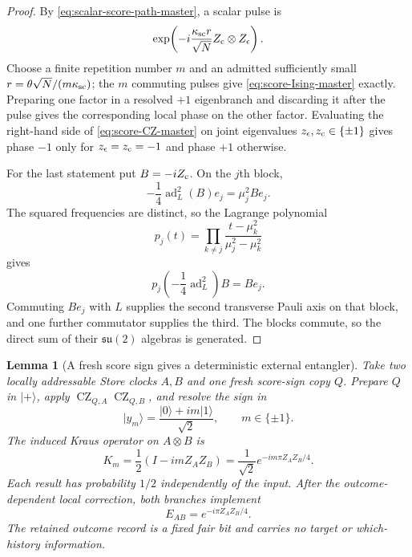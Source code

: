 \documentclass[11pt]{article}
\newtheorem{lemma}[theorem]{Lemma}
\theoremstyle{definition}
\theoremstyle{remark}
\begin{document}
\begin{proof}
By \eqref{eq:scalar-score-path-master}, a scalar pulse is
\[
 \exp\!\left(
 -i\frac{\kappa_{\rm sc}r}{\sqrt N}
 Z_{\rm c}\otimes Z_{\epsilon}\right).
\]
Choose a finite repetition number $m$ and an admitted sufficiently small
$r=\theta\sqrt N/(m\kappa_{\rm sc})$; the $m$ commuting pulses give
\eqref{eq:score-Ising-master} exactly.  Preparing one factor in a resolved
$+1$ eigenbranch and discarding it after the pulse gives the corresponding
local phase on the other factor.  Evaluating the right-hand side of
\eqref{eq:score-CZ-master} on joint eigenvalues
$z_{\epsilon},z_{\rm c}\in\{\pm1\}$ gives phase $-1$ only for
$z_{\epsilon}=z_{\rm c}=-1$ and phase $+1$ otherwise.

For the last statement put $B=-iZ_{\rm c}$.  On the $j$th block,
\[
 -\frac14\operatorname{ad}_L^2(B)e_j=\mu_j^2Be_j.
\]
The squared frequencies are distinct, so the Lagrange polynomial
\[
 p_j(t)=\prod_{k\ne j}
 \frac{t-\mu_k^2}{\mu_j^2-\mu_k^2}
\]
gives
\[
 p_j\!\left(-\frac14\operatorname{ad}_L^2\right)B=Be_j.
\]
Commuting $Be_j$ with $L$ supplies the second transverse Pauli axis on that
block, and one further commutator supplies the third.  The blocks commute, so
the direct sum of their $\mathfrak{su}(2)$ algebras is generated.
\end{proof}


\begin{lemma}[A fresh score sign gives a deterministic external entangler]
\label{lem:score-bus-entangler-master}
Take two locally addressable Store clocks $A,B$ and one fresh score-sign copy
$Q$.  Prepare $Q$ in $|+\rangle$, apply
$\operatorname{CZ}_{Q,A}\operatorname{CZ}_{Q,B}$, and resolve the sign in
\[
 |y_m\rangle=\frac{|0\rangle+im|1\rangle}{\sqrt2},
 \qquad m\in\{\pm1\}.
\]
The induced Kraus operator on $A\otimes B$ is
\begin{equation}
 \boxed{
 K_m=\frac12(I-imZ_AZ_B)
     =\frac1{\sqrt2}e^{-im\pi Z_AZ_B/4}.}
 \label{eq:score-bus-Kraus-master}
\end{equation}
Each result has probability $1/2$ independently of the input.  After the
outcome-dependent local correction, both branches implement
\begin{equation}
 \boxed{E_{AB}=e^{-i\pi Z_AZ_B/4}.}
 \label{eq:score-bus-entangler-master}
\end{equation}
The retained outcome record is a fixed fair bit and carries no target or
which-history information.
\end{lemma}
\end{document}
